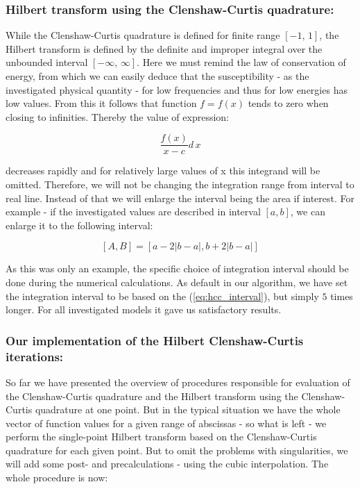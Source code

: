 \documentclass[12pt,twoside,a4paper]{article}
\numberwithin{equation}{subsection}
\numberwithin{figure}{subsection}
\begin{document}
\subsubsection*{Hilbert transform using the Clenshaw-Curtis quadrature:}

While the Clenshaw-Curtis quadrature is defined for finite range $[-1,\,1]$, the Hilbert transform is defined by the definite and improper integral over the unbounded interval $[-\infty,\, \infty]$. Here we must remind the law of conservation of energy, from which we can easily deduce that the susceptibility - as the investigated physical quantity - for low frequencies and thus for low energies has low values. From this it follows that function $f = f(x)$ tends to zero when closing to infinities. Thereby the value of expression:

\begin{equation} \label{eq:hcc_adapt}
  \frac{f(x)}{x-c} d \, x
\end{equation}

decreases rapidly and for relatively large values of x this integrand will be omitted. Therefore, we will not be changing the integration range from interval to real line. Instead of that we will enlarge the interval being the area if interest. For example - if the investigated values are described in interval $[a, b]$, we can enlarge it to the following interval:

\begin{equation} \label{eq:hcc_interval}
  [A, B] = [a - 2|b-a|, b + 2|b-a|] 
\end{equation}

As this was only an example, the specific choice of integration interval should be done during the numerical calculations. As default in our algorithm, we have set the integration interval to be based on the (\ref{eq:hcc_interval}), but simply $5$ times longer. For all investigated models it gave us satisfactory results.

\subsubsection*{Our implementation of the Hilbert Clenshaw-Curtis iterations:}

So far we have presented the overview of procedures responsible for evaluation of the Clenshaw-Curtis qua\-dra\-tu\-re and the Hil\-bert transform using the Clenshaw-Curtis qua\-dra\-ture at one point. But in the typical situation we have the whole vector of function values for a given range of abscissas - so what is left - we perform the single-point Hil\-bert transform based on the Clenshaw-Curtis qua\-dra\-ture for each given point. But to omit the problems with singularities, we will add some post- and precalculations - using the cubic interpolation. The whole procedure is now:
\end{document}
